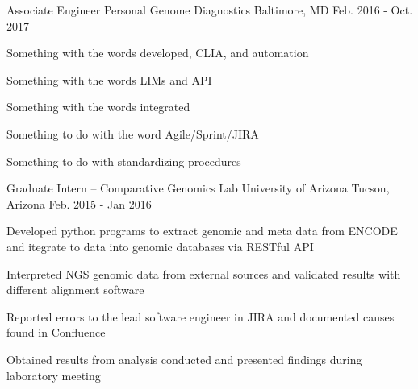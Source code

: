 \begin{cventries}
  \cventry
    {Associate Engineer} %
    {Personal Genome Diagnostics} %
    {Baltimore, MD} %
    {Feb. 2016 - Oct. 2017} %
    {
      \begin{cvitems} %
        \item{Something with the words developed, CLIA, and automation}
        \item{Something with the words LIMs and API}
        \item{Something with the words integrated}
        \item{Something to do with the word Agile/Sprint/JIRA}
        \item{Something to do with standardizing procedures}
      \end{cvitems}
    }

  \cventry
    {Graduate Intern – Comparative Genomics Lab} %
    {University of Arizona} %
    {Tucson, Arizona} %
    {Feb. 2015 - Jan 2016} %
    {
      \begin{cvitems} %
        \item{Developed python programs to extract genomic and meta data from ENCODE and itegrate to data into genomic databases via RESTful API}
        \item{Interpreted NGS genomic data from external sources and validated results with different alignment software}
        \item{Reported errors to the lead software engineer in JIRA and documented causes found in Confluence}
        \item{Obtained results from analysis conducted and presented findings during laboratory meeting}
      \end{cvitems}
    }


\end{cventries}
